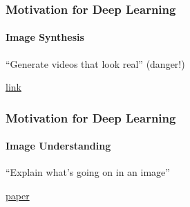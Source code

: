 \documentclass[xetex,professionalfont]{beamer}
\begin{document}
\begin{frame}
\frametitle{Motivation for Deep Learning}
\framesubtitle{Image Synthesis}

\begin{center}
\enquote{Generate videos that look real} (danger!)
\end{center}

\smallskip

\begin{center}
    {\centering\href{https://www.tiktok.com/@deeptomcruise/video/6932166297996233989?is_copy_url=1&is_from_webapp=v1}{link}}
\end{center}
    
\end{frame}


\begin{frame}
\frametitle{Motivation for Deep Learning}
\framesubtitle{Image Understanding}

\begin{center}
    \enquote{Explain what's going on in an image} %
\end{center}

\smallskip

\begin{center}
    {\centering\href{https://arxiv.org/pdf/2301.12597.pdf}{paper}}
\end{center}
    
\end{frame}
\end{document}
